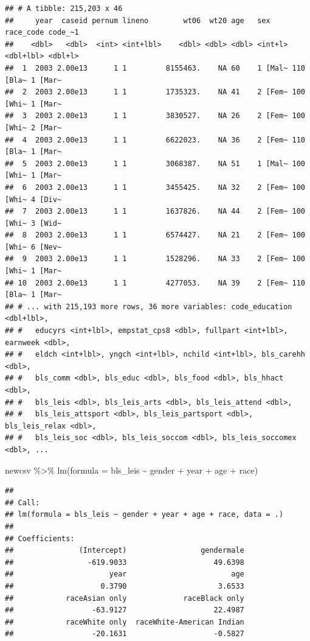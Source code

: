 \documentclass[
]{article}
\newenvironment{Shaded}{\begin{snugshade}}{\end{snugshade}}
\newcommand{\AttributeTok}[1]{\textcolor[rgb]{0.77,0.63,0.00}{#1}}
\newcommand{\FunctionTok}[1]{\textcolor[rgb]{0.00,0.00,0.00}{#1}}
\newcommand{\NormalTok}[1]{#1}
\newcommand{\SpecialCharTok}[1]{\textcolor[rgb]{0.00,0.00,0.00}{#1}}
\begin{document}
\begin{verbatim}
## # A tibble: 215,203 x 46
##     year  caseid pernum lineno        wt06  wt20 age   sex     race_code code_~1
##    <dbl>   <dbl>  <int> <int+lbl>    <dbl> <dbl> <dbl> <int+l> <dbl+lbl> <dbl+l>
##  1  2003 2.00e13      1 1         8155463.    NA 60    1 [Mal~ 110 [Bla~ 1 [Mar~
##  2  2003 2.00e13      1 1         1735323.    NA 41    2 [Fem~ 100 [Whi~ 1 [Mar~
##  3  2003 2.00e13      1 1         3830527.    NA 26    2 [Fem~ 100 [Whi~ 2 [Mar~
##  4  2003 2.00e13      1 1         6622023.    NA 36    2 [Fem~ 110 [Bla~ 1 [Mar~
##  5  2003 2.00e13      1 1         3068387.    NA 51    1 [Mal~ 100 [Whi~ 1 [Mar~
##  6  2003 2.00e13      1 1         3455425.    NA 32    2 [Fem~ 100 [Whi~ 4 [Div~
##  7  2003 2.00e13      1 1         1637826.    NA 44    2 [Fem~ 100 [Whi~ 3 [Wid~
##  8  2003 2.00e13      1 1         6574427.    NA 21    2 [Fem~ 100 [Whi~ 6 [Nev~
##  9  2003 2.00e13      1 1         1528296.    NA 33    2 [Fem~ 100 [Whi~ 1 [Mar~
## 10  2003 2.00e13      1 1         4277053.    NA 39    2 [Fem~ 110 [Bla~ 1 [Mar~
## # ... with 215,193 more rows, 36 more variables: code_education <dbl+lbl>,
## #   educyrs <int+lbl>, empstat_cps8 <dbl>, fullpart <int+lbl>, earnweek <dbl>,
## #   eldch <int+lbl>, yngch <int+lbl>, nchild <int+lbl>, bls_carehh <dbl>,
## #   bls_comm <dbl>, bls_educ <dbl>, bls_food <dbl>, bls_hhact <dbl>,
## #   bls_leis <dbl>, bls_leis_arts <dbl>, bls_leis_attend <dbl>,
## #   bls_leis_attsport <dbl>, bls_leis_partsport <dbl>, bls_leis_relax <dbl>,
## #   bls_leis_soc <dbl>, bls_leis_soccom <dbl>, bls_leis_soccomex <dbl>, ...
\end{verbatim}

\begin{Shaded}
\begin{Highlighting}[]
\NormalTok{newcsv }\SpecialCharTok{\%\textgreater{}\%}
  \FunctionTok{lm}\NormalTok{(}\AttributeTok{formula =}\NormalTok{ bls\_leis }\SpecialCharTok{\textasciitilde{}}\NormalTok{ gender }\SpecialCharTok{+}\NormalTok{ year }\SpecialCharTok{+}\NormalTok{ age }\SpecialCharTok{+}\NormalTok{ race) }
\end{Highlighting}
\end{Shaded}

\begin{verbatim}
## 
## Call:
## lm(formula = bls_leis ~ gender + year + age + race, data = .)
## 
## Coefficients:
##               (Intercept)                 gendermale  
##                 -619.9033                    49.6398  
##                      year                        age  
##                    0.3790                     3.6533  
##            raceAsian only             raceBlack only  
##                  -63.9127                    22.4987  
##            raceWhite only  raceWhite-American Indian  
##                  -20.1631                    -0.5827
\end{verbatim}
\end{document}
